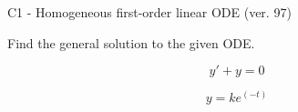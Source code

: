 \begin{exercise}
  \begin{exerciseTitle}C1 - Homogeneous first-order linear ODE (ver. 97)\end{exerciseTitle}
  \begin{exerciseStatement}
    
Find the general solution to the given ODE.

    
\[y'+y=0\]

  \end{exerciseStatement}
  \begin{exerciseAnswer}
    
\[y= k e^{\left(-t\right)}\]

  \end{exerciseAnswer}
\end{exercise}